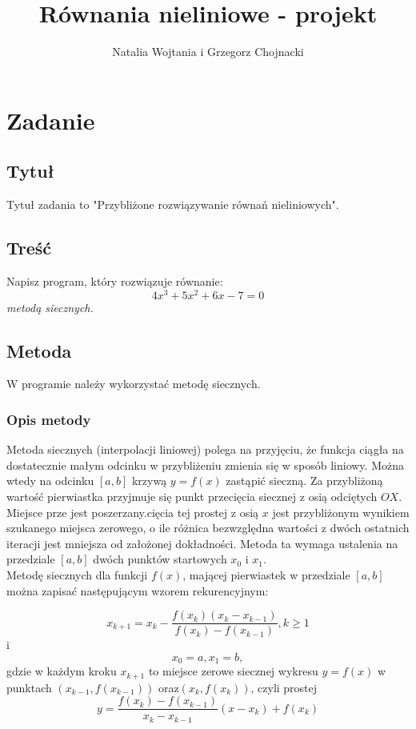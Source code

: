 \documentclass[12pt]{article}
\title{Równania nieliniowe - projekt}
\author{Natalia Wojtania i Grzegorz Chojnacki}
\begin{document}
\maketitle

\section{Zadanie}
\subsection{Tytuł}
Tytuł zadania to "Przybliżone rozwiązywanie równań nieliniowych".
\subsection{Treść}
Napisz program, który rozwiązuje równanie: $$4x^{3} + 5x^{2} + 6x - 7 = 0$$\emph{metodą siecznych.}
\subsection{Metoda}
W programie należy wykorzystać metodę siecznych.
\subsubsection{Opis metody}

Metoda siecznych (interpolacji liniowej) polega na przyjęciu, że funkcja ciągła na dostatecznie małym odcinku w przybliżeniu zmienia się w sposób liniowy. Można wtedy na odcinku $[a,b]$ krzywą $y=f(x)$ zastąpić sieczną. Za przybliżoną wartość pierwiastka przyjmuje się punkt przecięcia siecznej z osią odciętych $OX$. Miejsce prze jest poszerzany.cięcia tej prostej z osią $x$ jest przybliżonym wynikiem szukanego miejsca zerowego, o ile różnica bezwzględna wartości z dwóch ostatnich iteracji jest mniejsza od założonej dokładności.  Metoda ta wymaga ustalenia na przedziale $[a,b]$ dwóch punktów startowych $x_0$ i $x_1$.\\
Metodę siecznych dla funkcji $f(x)$, mającej pierwiastek w przedziale $[ a , b ]$ można zapisać następującym wzorem rekurencyjnym:

 $$x_{k+1}=x_k - \frac{f(x_k)(x_k-x_{k-1})}{f(x_k)-f(x_{k-1})}, k \geq 1$$ i $$x_0=a, x_1=b, $$ gdzie w każdym kroku $ x_{k+1}$ to miejsce zerowe siecznej wykresu $y=f(x)$ w punktach $(x_{k-1},f(x_{k-1}))$ oraz$ (x_{k},f(x_{k})) $, czyli prostej $$y=\frac{f(x_k)-f(x_{k-1})}{x_k-x_{k-1}}(x-x_k)+f(x_k)$$
\end{document}
